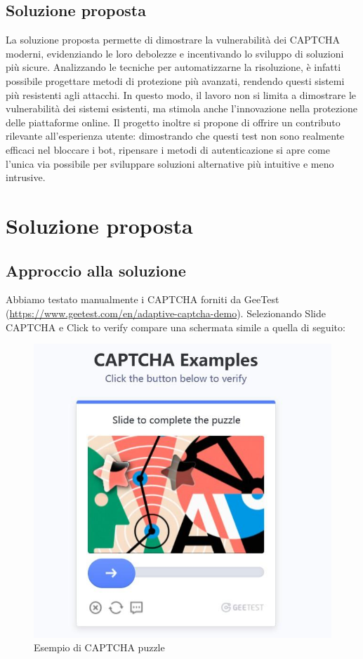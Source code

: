 \documentclass{article}
\begin{document}
\subsection{Soluzione proposta} La soluzione proposta permette di dimostrare la vulnerabilità dei CAPTCHA moderni, evidenziando le loro debolezze e incentivando lo sviluppo di soluzioni più sicure. Analizzando le tecniche per automatizzarne la risoluzione, è infatti possibile progettare metodi di protezione più avanzati, rendendo questi sistemi più resistenti agli attacchi. In questo modo, il lavoro non si limita a dimostrare le vulnerabilità dei sistemi esistenti, ma stimola anche l’innovazione nella protezione delle piattaforme online. Il progetto inoltre si propone di offrire un contributo rilevante all’esperienza utente: dimostrando che questi test non sono realmente efficaci nel bloccare i bot, ripensare i metodi di autenticazione si apre come l’unica via possibile per sviluppare soluzioni alternative più intuitive e meno intrusive. 

\section{Soluzione proposta}

\subsection{Approccio alla soluzione}
Abbiamo testato manualmente i CAPTCHA forniti da GeeTest
(\url{https://www.geetest.com/en/adaptive-captcha-demo}). 
Selezionando Slide CAPTCHA e Click to verify compare una schermata simile a quella di seguito:

\begin{figure}[h!]
    \centering
    \includegraphics[width=0.5\linewidth]{captcha.jpeg}
    \caption{Esempio di CAPTCHA puzzle}
    \label{captcha}
\end{figure}
\end{document}
